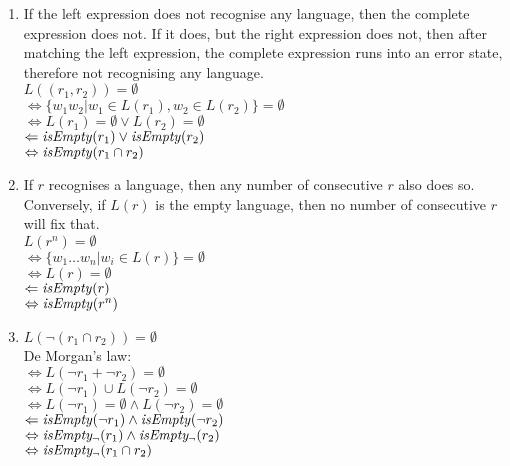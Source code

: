 \begin{lem}
\begin{enumerate}[label=\textbf{(\arabic*)}]
      \item
         If the left expression does not recognise any language, then the
         complete expression does not. If it does, but the right expression does
         not, then after matching the left expression, the complete expression
         runs into an error state, therefore not recognising any language. \\
         $L((r_1, r_2)) = \emptyset$ \\
         $\Leftrightarrow \{ w_1w_2 | w_1 \in L(r_1), w_2 \in L(r_2) \} = \emptyset$ \\
         $\Leftrightarrow L(r_1) = \emptyset \vee L(r_2) = \emptyset$ \\
         $\Leftarrow \mathit{isEmpty}(r_1) \vee \mathit{isEmpty}(r_2)$ \\
         $\Leftrightarrow \mathit{isEmpty}(r_1 \cap r_2)$

      \item
         If $r$ recognises a language, then any number of consecutive $r$ also
         does so. Conversely, if $L(r)$ is the empty language, then no number of
         consecutive $r$ will fix that. \\
         $L(r^n) = \emptyset$ \\
         $\Leftrightarrow \{ w_1 \dots w_n | w_i \in L(r) \} = \emptyset$ \\
         $\Leftrightarrow L(r) = \emptyset$ \\
         $\Leftarrow \mathit{isEmpty}(r)$ \\
         $\Leftrightarrow \mathit{isEmpty}(r^n)$

      \item
         $L(\neg(r_1 \cap r_2)) = \emptyset$ \\
         De Morgan's law: \\
         $\Leftrightarrow L(\neg r_1 + \neg r_2) = \emptyset$ \\
         $\Leftrightarrow L(\neg r_1) \cup L(\neg r_2) = \emptyset$ \\
         $\Leftrightarrow L(\neg r_1) = \emptyset \wedge L(\neg r_2) = \emptyset$ \\
         $\Leftarrow \mathit{isEmpty}(\neg r_1) \wedge \mathit{isEmpty}(\neg r_2)$ \\
         $\Leftrightarrow \mathit{isEmpty_\neg}(r_1) \wedge \mathit{isEmpty_\neg}(r_2)$ \\
         $\Leftrightarrow \mathit{isEmpty_\neg}(r_1 \cap r_2)$


\end{enumerate}
\end{lem}
